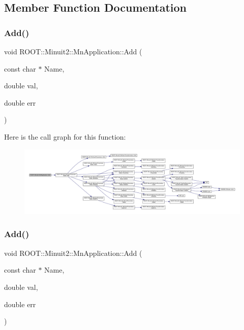 \subsection{Member Function Documentation}
\mbox{\label{classROOT_1_1Minuit2_1_1MnApplication_a2912c94b7cb69b29862e1e41ffbc4542}} 
\subsubsection{\texorpdfstring{Add()}{Add()}\hspace{0.1cm}{\footnotesize\ttfamily [1/6]}}
{\footnotesize\ttfamily void R\+O\+O\+T\+::\+Minuit2\+::\+Mn\+Application\+::\+Add (\begin{DoxyParamCaption}\item[{const char $\ast$}]{Name,  }\item[{double}]{val,  }\item[{double}]{err }\end{DoxyParamCaption})}

Here is the call graph for this function\+:\nopagebreak
\begin{figure}[H]
\begin{center}
\leavevmode
\includegraphics[width=350pt]{df/dd5/classROOT_1_1Minuit2_1_1MnApplication_a2912c94b7cb69b29862e1e41ffbc4542_cgraph}
\end{center}
\end{figure}
\mbox{\label{classROOT_1_1Minuit2_1_1MnApplication_a2912c94b7cb69b29862e1e41ffbc4542}} 
\subsubsection{\texorpdfstring{Add()}{Add()}\hspace{0.1cm}{\footnotesize\ttfamily [2/6]}}
{\footnotesize\ttfamily void R\+O\+O\+T\+::\+Minuit2\+::\+Mn\+Application\+::\+Add (\begin{DoxyParamCaption}\item[{const char $\ast$}]{Name,  }\item[{double}]{val,  }\item[{double}]{err }\end{DoxyParamCaption})}

